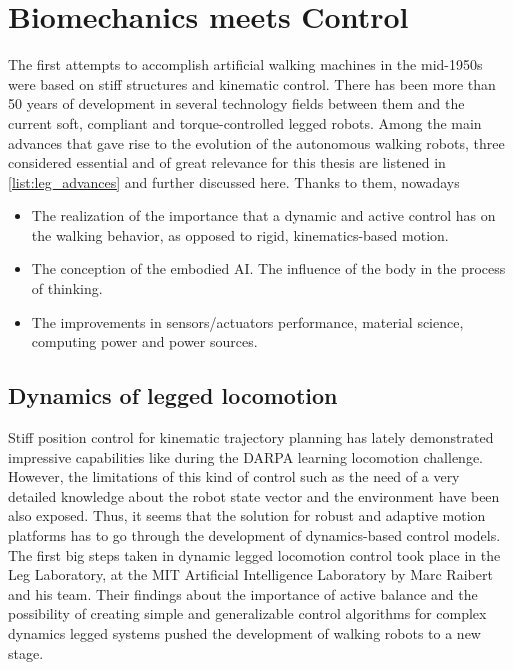 
\section{Biomechanics meets Control} %
\label{sec:biomechanics_vs_control}
The first attempts to accomplish artificial walking machines in the mid-1950s were based on stiff structures and kinematic control.
There has been more than 50 years of development in several technology fields between them and the current soft, compliant and torque-controlled legged robots.
Among the main advances that gave rise to the evolution of the autonomous walking robots, three considered essential and of great relevance for this thesis are listened in \ref{list:leg_advances} and further discussed here.
Thanks to them, nowadays 

\begin{itemize}
\label{list:leg_advances}
	\item The realization of the importance that a dynamic and active control has on the walking behavior, as opposed to rigid, kinematics-based motion.
	\item The conception of the embodied AI. The influence of the body in the process of thinking.
	\item The improvements in sensors/actuators performance, material science, computing power and power sources.
\end{itemize}

\subsection{Dynamics of legged locomotion} %
\label{sub:dynamics_control}
Stiff position control for kinematic trajectory planning has lately demonstrated impressive capabilities like during the DARPA learning locomotion challenge.
However, the limitations of this kind of control such as the need of a very detailed knowledge  about the robot state vector and the environment have been also exposed.
Thus, it seems that the solution for robust and adaptive motion platforms has to go through the development of dynamics-based control models.
The first big steps taken in dynamic legged locomotion control took place in the Leg Laboratory, at the MIT Artificial Intelligence Laboratory by Marc Raibert and his team.
Their findings about the importance of active balance and the possibility of creating simple and generalizable control algorithms for complex dynamics legged systems \cite{mit_leg_lab1} pushed the development of walking robots to a new stage.


